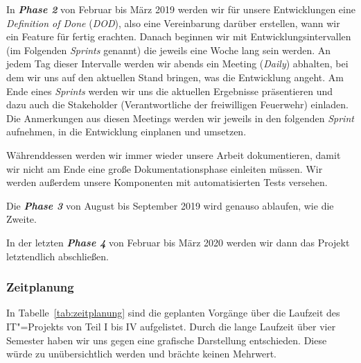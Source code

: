 In \textit{\textbf{Phase 2}} von Februar bis März 2019 werden wir für unsere Entwicklungen eine \textit{Definition of Done} (\textit{DOD}), also eine Vereinbarung darüber erstellen, wann wir ein Feature für fertig erachten. Danach beginnen wir mit Entwicklungsintervallen (im Folgenden \textit{Sprints }genannt) die jeweils eine Woche lang sein werden. An jedem Tag dieser Intervalle werden wir abends ein Meeting (\textit{Daily}) abhalten, bei dem wir uns auf den aktuellen Stand bringen, was die Entwicklung angeht. Am Ende eines \textit{Sprints} werden wir uns die aktuellen Ergebnisse präsentieren und dazu auch die Stakeholder (Verantwortliche der freiwilligen Feuerwehr) einladen. Die Anmerkungen aus diesen Meetings werden wir jeweils in den folgenden \textit{Sprint} aufnehmen, in die Entwicklung einplanen und umsetzen. 

Währenddessen werden wir immer wieder unsere Arbeit dokumentieren, damit wir nicht am Ende eine große Dokumentationsphase einleiten müssen. Wir werden außerdem unsere Komponenten mit automatisierten Tests versehen.

Die \textit{\textbf{Phase 3}} von August bis September 2019 wird genauso ablaufen, wie die Zweite.

In der letzten \textit{\textbf{Phase 4}} von Februar bis März 2020 werden wir dann das Projekt letztendlich abschließen.  

\subsubsection{Zeitplanung}

In Tabelle~\ref{tab:zeitplanung} sind die geplanten Vorgänge über die Laufzeit des IT"=Projekts von Teil I bis IV aufgelistet. Durch die lange Laufzeit über vier Semester haben wir uns gegen eine grafische Darstellung entschieden. Diese würde zu unübersichtlich werden und brächte keinen Mehrwert.

